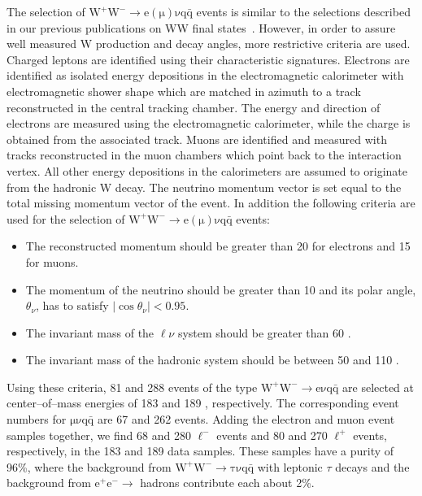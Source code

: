 \documentclass[12pt,a4paper,dvips]{article}
\begin{document}
The selection of $\mathrm{W^{+}W^{-} \rightarrow e (\mu) \nu q\bar{q}}$ events
is similar to the  selections described in our previous publications 
on WW final states~\cite{wwl31,*wwl32}. However, in order to assure 
well measured W production and decay angles, 
more restrictive criteria are used.
Charged leptons are identified using their characteristic
signatures.  Electrons are identified as isolated energy depositions
in the electromagnetic calorimeter with electromagnetic shower
shape which are matched in azimuth to a track reconstructed in the
central tracking chamber. The energy and direction of electrons are
measured using the electromagnetic calorimeter, 
while the charge is obtained from the associated track. 
Muons are identified and measured with tracks
reconstructed in the muon chambers which point back to the interaction
vertex. All other energy depositions in the calorimeters are assumed to 
originate from the hadronic W decay. The neutrino 
momentum vector is set equal to the total missing momentum vector of the 
event. In addition the following criteria are used for the selection of 
$\mathrm{W^{+}W^{-} \rightarrow e (\mu) \nu q\bar{q}}$ events:
\begin{itemize}
\item 
The reconstructed momentum 
should be greater than 20 \GeV{} for electrons and 15 \GeV{} for muons.
\item
The momentum of the neutrino should be greater than 10 \GeV{} 
and its polar angle, $\theta_{\nu}$, 
has to satisfy $|\cos \theta_{\nu}| < 0.95$.
\item 
The invariant mass of the $\ell \nu$ system should be 
greater than 60 \GeV{}.

\item
The invariant mass of the hadronic system should be 
between 50 and 110 \GeV{}.
\end{itemize}

Using these criteria, 81 and 288 events of the type 
$\mathrm{W^{+}W^{-} \rightarrow e \nu q\bar{q}}$
are selected at center--of--mass energies of 183 \GeV{} and 
189 \GeV{}, respectively. The corresponding event numbers for 
$\mathrm{\mu \nu q\bar{q}}$ 
are 67 and 262 events. 
Adding the electron and muon event samples together,
we find 68 and 280 $\ell^{-}$ events and 80 and 270 $\ell^{+}$ events, 
respectively, in the 183 \GeV{} and 189 \GeV{} data samples.   
These samples have a purity of 96\%, where 
the background from $\mathrm{W^{+}W^{-} \rightarrow \tau \nu q\bar{q}}$
with leptonic $\tau$ decays 
and the background from $\mathrm{e^{+}e^{-}} \rightarrow$ hadrons
contribute each about 2\%. 
\end{document}
